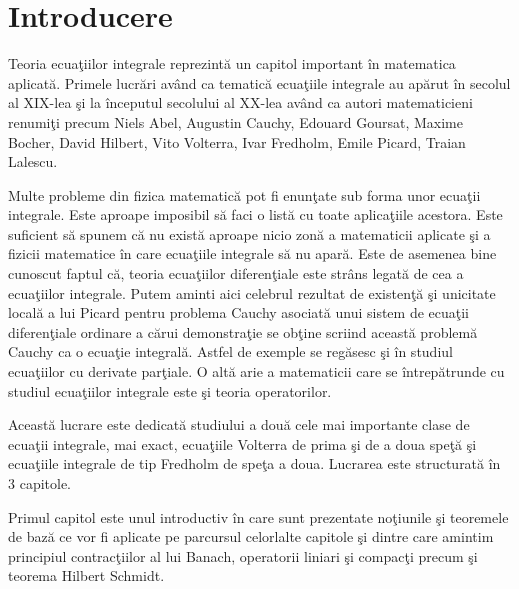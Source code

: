\documentclass[a4paper,12pt,oneside]{report}
\begin{document}
\chapter*{Introducere}

Teoria ecua\c{t}iilor integrale reprezint\u{a} un capitol important \^{i}n matematica aplicat\u{a}. Primele lucr\u{a}ri  av\^{a}nd ca tematic\u{a} ecua\c{t}iile integrale  au ap\u{a}rut \^{i}n secolul al XIX-lea \c{s}i la \^{i}nceputul secolului al XX-lea av\^{a}nd ca autori matematicieni renumi\c{t}i precum Niels Abel, Augustin Cauchy, Edouard Goursat, Maxime Bocher, David Hilbert, Vito Volterra, Ivar Fredholm, Emile Picard, Traian Lalescu. 

Multe probleme din fizica matematic\u{a} pot fi enun\c{t}ate sub forma unor
ecua\c{t}ii integrale. Este aproape imposibil s\u{a} faci o list\u{a} cu toate aplica\c{t}iile acestora.
Este suficient s\u{a} spunem c\u{a} nu exist\u{a} aproape nicio zon\u{a} a matematicii aplicate \c{s}i a
fizicii matematice \^{i}n care ecua\c{t}iile integrale s\u{a} nu apar\u{a}.
Este de asemenea bine cunoscut faptul c\u{a}, teoria ecua\c{t}iilor diferen\c{t}iale este str\^{a}ns legat\u{a} de cea a ecua\c{t}iilor integrale. Putem aminti aici celebrul rezultat de existen\c{t}\u{a} \c{s}i unicitate local\u{a} a lui Picard pentru problema Cauchy asociat\u{a} unui sistem de ecua\c{t}ii diferen\c{t}iale ordinare a c\u{a}rui demonstra\c{t}ie se ob\c{t}ine scriind aceast\u{a} problem\u{a} Cauchy ca o ecua\c{t}ie integral\u{a}. Astfel de exemple se reg\u{a}sesc \c{s}i \^{i}n studiul ecua\c{t}iilor cu derivate par\c{t}iale. O alt\u{a} arie a matematicii care se \^{i}ntrep\u{a}trunde cu studiul ecua\c{t}iilor integrale este \c{s}i teoria operatorilor.

Aceast\u{a} lucrare este dedicat\u{a} studiului a dou\u{a} cele mai importante clase de ecua\c{t}ii integrale, mai exact, ecua\c{t}iile Volterra de prima \c{s}i de a doua spe\c{t}\u{a} \c{s}i ecua\c{t}iile integrale de tip Fredholm de spe\c{t}a a doua.
Lucrarea este structurat\u{a} \^{i}n 3 capitole.

Primul capitol este unul introductiv \^{i}n care sunt prezentate no\c{t}iunile \c{s}i teoremele de baz\u{a} ce vor fi aplicate  pe parcursul celorlalte capitole \c{s}i dintre care amintim principiul contrac\c{t}iilor al lui Banach, operatorii liniari \c{s}i compac\c{t}i precum \c{s}i  teorema Hilbert Schmidt.
\end{document}
